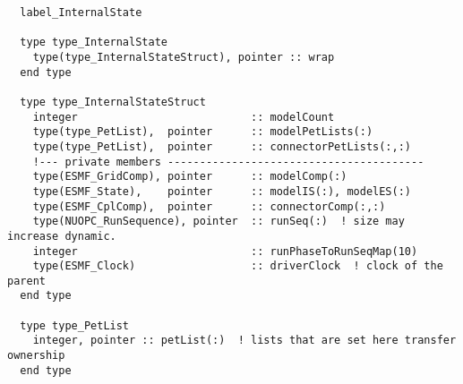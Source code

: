 \begin{verbatim}  label_InternalState

  type type_InternalState
    type(type_InternalStateStruct), pointer :: wrap
  end type

  type type_InternalStateStruct
    integer                           :: modelCount
    type(type_PetList),  pointer      :: modelPetLists(:)
    type(type_PetList),  pointer      :: connectorPetLists(:,:)
    !--- private members ----------------------------------------
    type(ESMF_GridComp), pointer      :: modelComp(:)
    type(ESMF_State),    pointer      :: modelIS(:), modelES(:)
    type(ESMF_CplComp),  pointer      :: connectorComp(:,:)
    type(NUOPC_RunSequence), pointer  :: runSeq(:)  ! size may increase dynamic.
    integer                           :: runPhaseToRunSeqMap(10)
    type(ESMF_Clock)                  :: driverClock  ! clock of the parent
  end type

  type type_PetList
    integer, pointer :: petList(:)  ! lists that are set here transfer ownership
  end type
  
\end{verbatim}

